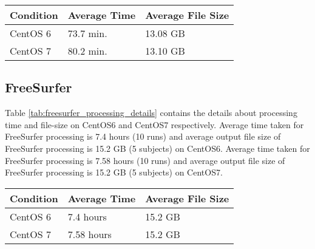 \begin{center}
\tabulinesep=1.2mm
\begin{tabular}{ | l | l | l | } 
  \hline
    \textbf{Condition} & \textbf{Average Time} & \textbf{Average File Size} \\
  \hline
    CentOS 6 & 73.7 min. & 13.08 GB \\
  \hline
    CentOS 7 & 80.2 min. & 13.10 GB \\
  \hline
\end{tabular}
\label{tab:prefreesurfer_processing_details}
\end{center}



\subsection{FreeSurfer}
Table \ref{tab:freesurfer_processing_details} contains the details about processing time and file-size on CentOS6 and CentOS7 respectively.
Average time taken for FreeSurfer processing is 7.4 hours (10 runs) and average output file size of FreeSurfer processing is 15.2 GB (5 subjects) on CentOS6.
Average time taken for FreeSurfer processing is 7.58 hours (10 runs) and average output file size of FreeSurfer processing is 15.2 GB (5 subjects) on CentOS7.

\begin{center}
\begin{tabular}{ | l | l | l | }
  \hline
    \textbf{Condition} & \textbf{Average Time} & \textbf{Average File Size} \\
  \hline
    CentOS 6 & 7.4 hours & 15.2 GB \\
  \hline
    CentOS 7 & 7.58 hours & 15.2 GB \\
  \hline
\end{tabular}
\label{tab:freesurfer_processing_details}
\end{center}

